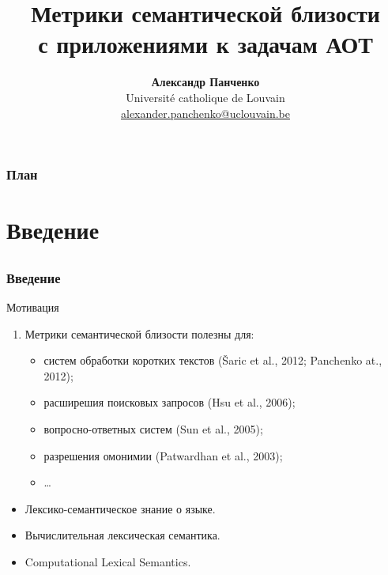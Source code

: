 \documentclass{beamer}
\title[\insertframenumber/\inserttotalframenumber]
{\textbf{Метрики семантической близости \\ с приложениями к задачам АОТ}}
\author[Александр Панченко]
{\textbf{Александр Панченко} \\ Université catholique de Louvain   \\ { \url{alexander.panchenko@uclouvain.be}  }}
\begin{document}
\begin{frame}
  \titlepage
\end{frame}

\begin{frame}
  \setcounter{tocdepth}{1}
  \frametitle{План}
  \tableofcontents
  \setcounter{tocdepth}{2}
	
\end{frame}

\section[Введение]{Введение}
\subsection{ }

\begin{frame}
\frametitle{Введение}

\begin{block}{Мотивация}

\begin{enumerate}
\item Метрики семантической близости \alert{полезны} для:
	\begin{itemize}
	\item систем обработки коротких текстов (Šaric et al., 2012; Panchenko at.,
	2012);
	\item расширешия поисковых запросов (Hsu et al., 2006);
	\item вопросно-ответных систем (Sun et al., 2005);
	\item разрешения омонимии (Patwardhan et al., 2003);
	\item \ldots 
	\end{itemize}

\end{enumerate}
\end{block}

\begin{itemize}
  \item Лексико-семантическое знание о языке.
  \item Вычислительная лексическая семантика.
  \item Computational Lexical Semantics. 
\end{itemize}



\note[item]{\ldots}
\note[item]{\ldots}


\end{frame}
\end{document}
